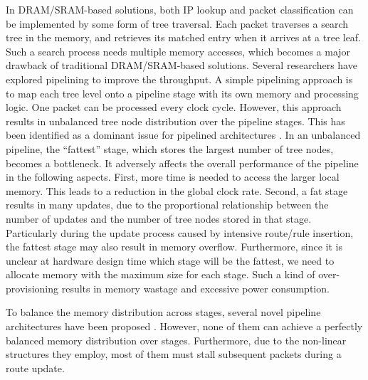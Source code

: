 \documentclass{sigcomm-alternate}
\begin{document}
In DRAM/SRAM-based solutions, both IP lookup and packet classification can be implemented by some form of tree traversal. Each packet traverses a search tree in the memory, and retrieves its matched entry when it arrives at a tree leaf. Such a search process needs multiple memory accesses, which becomes a major drawback of traditional DRAM/SRAM-based solutions. Several researchers have explored pipelining to improve the throughput. A simple pipelining approach is to map each tree level onto a pipeline stage with its own memory and processing logic. One packet can be processed every clock cycle. However, this approach results in unbalanced tree node distribution over the pipeline stages. This has been identified as a dominant issue for pipelined architectures \cite{infocom03:basu}. In an unbalanced pipeline, the ``fattest'' stage, which stores the largest number of tree nodes, becomes a bottleneck. It adversely affects the overall performance of the pipeline in the following aspects. First, more time is needed to access the larger local memory. This leads to a reduction in the global clock rate. Second, a fat stage results in many updates, due to the proportional relationship between the number of updates and the number of tree nodes stored in that stage. Particularly during the update process caused by intensive route/rule insertion, the fattest stage may also result in memory overflow. Furthermore, since it is unclear at hardware design time which stage will be the fattest, we need to allocate memory with the maximum size for each stage. Such a kind of over-provisioning results in memory wastage \cite{isca05:baboescu} and excessive power consumption.

To balance the memory distribution across stages, several novel pipeline architectures have been proposed \cite{isca05:baboescu, ancs06:kumar, hoti07:jiang}. However, none of them can achieve a perfectly balanced memory distribution over stages. Furthermore, due to the non-linear structures they employ, most of them must stall subsequent packets during a route update. 
\end{document}

